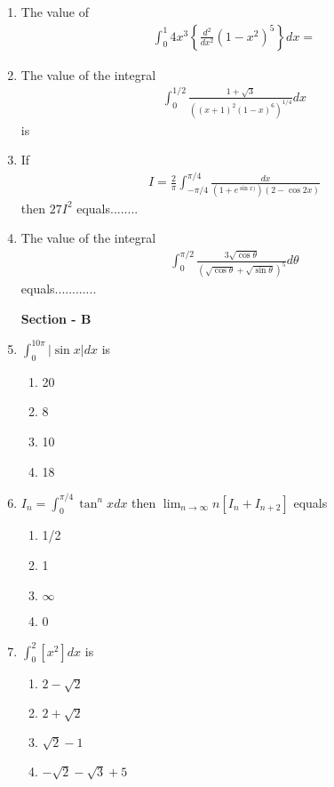 \begin{enumerate}[label=\arabic*.,ref=\thesubsection.\theenumi]
\item The value of 
\begin{align*}
\int_{0}^{1}4x^3\left\lbrace\frac{d^2}{dx^2}(1 - x^2)^5\right\rbrace dx = 
\end{align*}

\item The value of the integral
\begin{align*}
\int_{0}^{1/2}\frac{1 + \sqrt{3}}{((x + 1)^2(1 - x)^6)^{1/4}}dx
\end{align*}
is

\item If 
\begin{align*}
I = \frac{2}{\pi}\int_{-\pi/4}^{\pi/4}\frac{dx}{(1 + e^{\sin x)})(2 - \cos 2x)} 
\end{align*}
then $27I^{2}$ equals........

\item The value of the integral
\begin{align*}
\int_{0}^{\pi/2}\frac{3\sqrt{\cos \theta}}{\left(\sqrt{\cos \theta} + \sqrt{\sin \theta}\right)^{5}}d\theta
\end{align*}
equals............

\textbf{Section - B}

\item $\int_{0}^{10\pi}|\sin x|dx$ is
\begin{enumerate}
\item 20
\item 8
\item 10
\item 18
\end{enumerate}

\item $I_n = \int_{0}^{\pi/4}\tan^{n}x dx$ then $\lim_{n \to \infty}n[I_n + I_{n + 2}]$ equals
\begin{enumerate}
\item 1/2
\item 1
\item $\infty$
\item 0
\end{enumerate}

\item $\int_{0}^{2}[x^2]dx$ is
\begin{enumerate}
\item $2 - \sqrt{2}$
\item $2 + \sqrt{2}$
\item $\sqrt{2} - 1$
\item $-\sqrt{2} - \sqrt{3} + 5$
\end{enumerate}


\end{enumerate}
